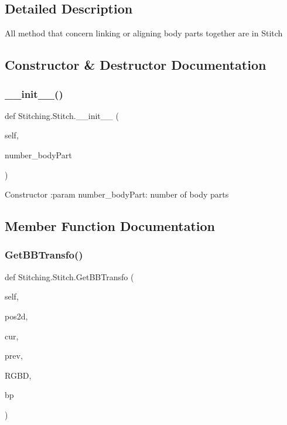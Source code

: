 \subsection{Detailed Description}
\begin{DoxyVerb}All method that concern linking or aligning body parts together are in Stitch
\end{DoxyVerb}
 

\subsection{Constructor \& Destructor Documentation}
\mbox{\label{class_stitching_1_1_stitch_ab891a54caf4e40cd3a6eacdfae3d08f2}} 
\subsubsection{\texorpdfstring{\+\_\+\+\_\+init\+\_\+\+\_\+()}{\_\_init\_\_()}}
{\footnotesize\ttfamily def Stitching.\+Stitch.\+\_\+\+\_\+init\+\_\+\+\_\+ (\begin{DoxyParamCaption}\item[{}]{self,  }\item[{}]{number\+\_\+body\+Part }\end{DoxyParamCaption})}

\begin{DoxyVerb}Constructor
:param number_bodyPart: number of body parts
\end{DoxyVerb}
 

\subsection{Member Function Documentation}
\mbox{\label{class_stitching_1_1_stitch_a24d4c32a258141cbdc3cfa3bae127fe7}} 
\subsubsection{\texorpdfstring{Get\+B\+B\+Transfo()}{GetBBTransfo()}}
{\footnotesize\ttfamily def Stitching.\+Stitch.\+Get\+B\+B\+Transfo (\begin{DoxyParamCaption}\item[{}]{self,  }\item[{}]{pos2d,  }\item[{}]{cur,  }\item[{}]{prev,  }\item[{}]{R\+G\+BD,  }\item[{}]{bp }\end{DoxyParamCaption})}

